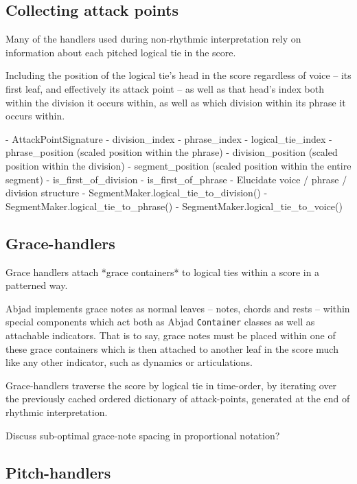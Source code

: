 \subsection{Collecting attack points}

Many of the handlers used during non-rhythmic interpretation rely on
information about each pitched logical tie in the score.

Including the position of the logical tie's head in the score regardless of
voice -- its first leaf, and effectively its attack point -- as well as that
head's index both within the division it occurs within, as well as which
division within its phrase it occurs within.

\begin{markdown}
-   AttackPointSignature
    -   division_index
    -   phrase_index
    -   logical_tie_index
    -   phrase_position (scaled position within the phrase)
    -   division_position (scaled position within the division)
    -   segment_position (scaled position within the entire segment)
    -   is_first_of_division
    -   is_first_of_phrase
-   Elucidate voice / phrase / division structure
-   SegmentMaker.logical_tie_to_division()
-   SegmentMaker.logical_tie_to_phrase()
-   SegmentMaker.logical_tie_to_voice()
\end{markdown}

\subsection{Grace-handlers}
\label{ssec:grace-handlers}

Grace handlers attach *grace containers* to logical ties within a score in a
patterned way.

Abjad implements grace notes as normal leaves -- notes, chords and rests --
within special components which act both as Abjad \texttt{Container} classes as
well as attachable indicators. That is to say, grace notes must be placed
within one of these grace containers which is then attached to another leaf in
the score much like any other indicator, such as dynamics or articulations.

Grace-handlers traverse the score by logical tie in time-order, by iterating
over the previously cached ordered dictionary of attack-points, generated at
the end of rhythmic interpretation.

Discuss sub-optimal grace-note spacing in proportional notation?

\subsection{Pitch-handlers}
\label{ssec:pitch-handlers}

